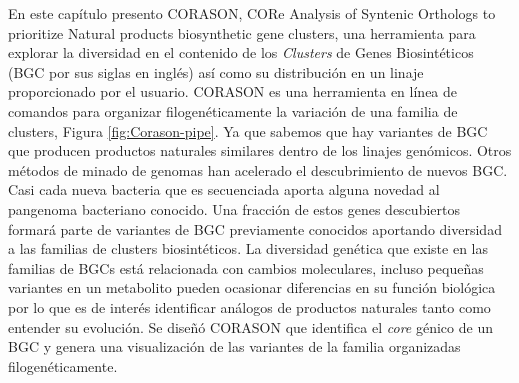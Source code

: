 \documentclass[12pt,twoside]{reedthesis}
\begin{document}
  En este capítulo presento CORASON, CORe Analysis of Syntenic Orthologs
  to prioritize Natural products biosynthetic gene clusters, una
  herramienta para explorar la diversidad en el contenido de los
  \emph{Clusters} de Genes Biosintéticos (BGC por sus siglas en inglés)
  así como su distribución en un linaje proporcionado por el usuario.
  CORASON es una herramienta en línea de comandos para organizar
  filogenéticamente la variación de una familia de clusters, Figura
  \autoref{fig:Corason-pipe}. Ya que sabemos que hay variantes de BGC que
  producen productos naturales similares dentro de los linajes genómicos.
  Otros métodos de minado de genomas han acelerado el descubrimiento de
  nuevos BGC. Casi cada nueva bacteria que es secuenciada aporta alguna
  novedad al pangenoma bacteriano conocido. Una fracción de estos genes
  descubiertos formará parte de variantes de BGC previamente conocidos
  aportando diversidad a las familias de clusters biosintéticos. La
  diversidad genética que existe en las familias de BGCs está relacionada
  con cambios moleculares, incluso pequeñas variantes en un metabolito
  pueden ocasionar diferencias en su función biológica por lo que es de
  interés identificar análogos de productos naturales tanto como entender
  su evolución. Se diseñó CORASON que identifica el \emph{core} génico de
  un BGC y genera una visualización de las variantes de la familia
  organizadas filogenéticamente.
  
\end{document}
